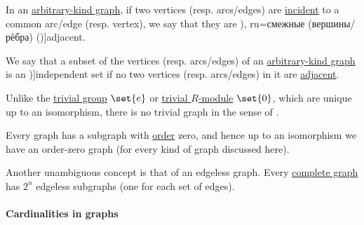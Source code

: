 \begin{definition}\label{def:graph_adjacency}
  In an \hyperref[rem:arbitrary_kind_graph]{arbitrary-kind graph}, if two vertices (resp. arcs/edges) are \hyperref[def:graph_incidence]{incident} to a common arc/edge (resp. vertex), we say that they are \term[bg=съседни (върхове/дъги/ребра) (\cite[7]{Мирчев2001}), ru=смежные (вершины/рёбра) (\cite[9]{Емеличев1990})]{adjacent}.
\end{definition}

\begin{definition}\label{def:graph_independent_set}
  We say that a subset of the vertices (resp. arcs/edges) of an \hyperref[rem:arbitrary_kind_graph]{arbitrary-kind graph} is an \term[bg=независимо множество (\cite[103]{Мирчев2001})]{independent set} if no two vertices (resp. arcs/edges) in it are \hyperref[def:graph_adjacency]{adjacent}.
\end{definition}

\begin{remark}\label{rem:trivial_graph}
  Unlike the \hyperref[def:group/trivial]{trivial group} \( \set{ e } \) or \hyperref[def:module/trivial]{trivial \( R \)-module} \( \set{ 0 } \), which are unique up to an isomorphism, there is no trivial graph in the sense of .

  Every graph has a subgraph with \hyperref[def:graph_cardinality/order]{order} zero, and hence up to an isomorphism we have an order-zero graph (for every kind of graph discussed here).

  Another unambiguous concept is that of an edgeless graph. Every \hyperref[def:complete_graph]{complete graph} has \( 2^n \) edgeless subgraphs (one for each set of edges).
\end{remark}

\paragraph{Cardinalities in graphs}

